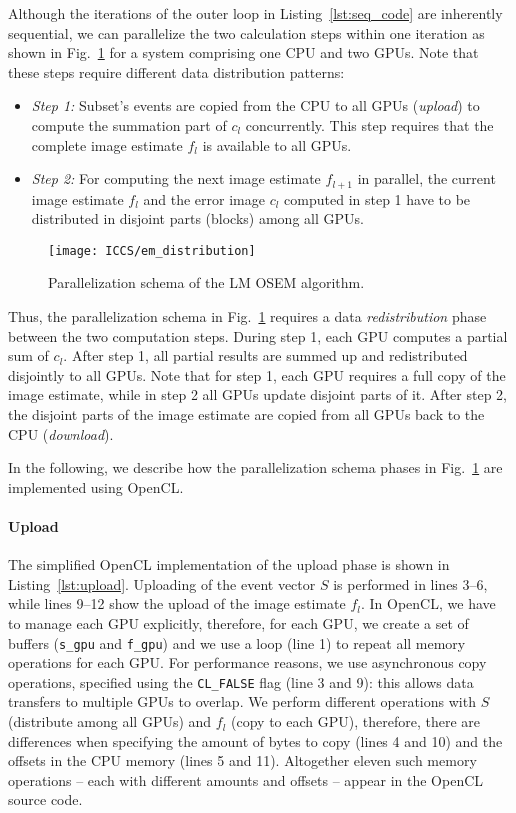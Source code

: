 Although the iterations of the outer loop in Listing~\ref{lst:seq_code} are inherently sequential,
we can parallelize the two calculation steps within one iteration as shown in Fig.~\ref{fig:em_distribution} for a system comprising one CPU and two GPUs.
Note that these steps require different data distribution patterns:
\begin{itemize}
  \item[] \emph{Step 1:} Subset's events are copied from the CPU to all GPUs (\emph{upload}) to compute the summation part of $c_l$ concurrently. This step requires that the complete image estimate $f_l$ is available to all GPUs.
  \item[] \emph{Step 2:} For computing the next image estimate $f_{l+1}$ in parallel, the current image estimate $f_l$ and the error image $c_l$ computed in step 1 have to be distributed in disjoint parts (blocks) among all GPUs.
\end{itemize}
\begin{figure}
\centering
\texttt{[image: ICCS/em\_distribution]}
\caption{Parallelization schema of the LM OSEM algorithm.}
\label{fig:em_distribution}
\end{figure}
Thus, the parallelization schema in Fig.~\ref{fig:em_distribution} requires a data \emph{redistribution} phase between the two computation steps.
During step 1, each GPU computes a partial sum of $c_l$.
After step 1, all partial results are summed up and redistributed disjointly to all GPUs.
Note that for step 1, each GPU requires a full copy of the image estimate, while in step 2 all GPUs update disjoint parts of it.
After step 2, the disjoint parts of the image estimate are copied from all GPUs back to the CPU (\emph{download}).

\bigskip\noindent
In the following, we describe how the parallelization schema phases in Fig.~\ref{fig:em_distribution} are implemented using OpenCL.

\paragraph{Upload}
The simplified OpenCL implementation of the upload phase is shown in Listing~\ref{lst:upload}.
Uploading of the event vector $S$ is performed in lines 3--6, while lines 9--12 show the upload of the image estimate $f_l$.
In OpenCL, we have to manage each GPU explicitly, therefore, for each GPU, we create a set of buffers (\texttt{s\_gpu} and \texttt{f\_gpu}) and we use a loop (line 1) to repeat all memory operations for each GPU.
For performance reasons, we use asynchronous copy operations, specified using the \texttt{CL\_FALSE} flag (line 3 and 9): this allows data transfers to multiple GPUs to overlap.
We perform different operations with $S$ (distribute among all GPUs) and $f_l$ (copy to each GPU), therefore, there are differences when specifying the amount of bytes to copy (lines 4 and 10) and the offsets in the CPU memory (lines 5 and 11).
Altogether eleven such memory operations -- each with different amounts and offsets -- appear in the OpenCL source code.

